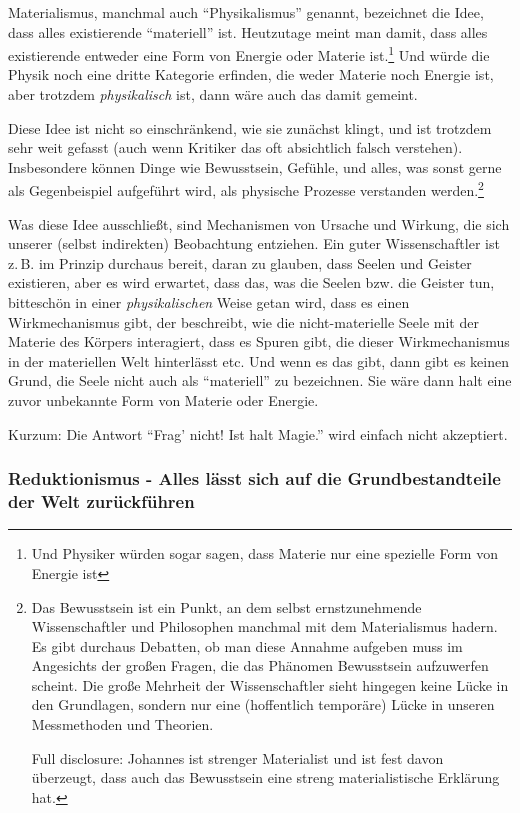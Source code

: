 Materialismus, manchmal auch \enquote{Physikalismus} genannt, bezeichnet die Idee, dass alles existierende
\enquote{materiell}
ist. Heutzutage meint man damit, dass alles existierende entweder eine Form von Energie oder Materie ist.\footnote{Und Physiker würden sogar sagen, dass Materie nur eine spezielle Form von Energie ist} Und würde die Physik noch eine dritte
Kategorie erfinden, die weder Materie noch Energie ist, aber trotzdem \emph{physikalisch}
ist, dann wäre auch das damit gemeint.\cite{sep-physicalism}

Diese Idee ist nicht so einschränkend, wie sie zunächst klingt, und ist trotzdem sehr weit gefasst (auch wenn Kritiker
das oft absichtlich falsch verstehen). Insbesondere können Dinge wie Bewusstsein, Gefühle, und alles, was sonst gerne
als Gegenbeispiel aufgeführt wird, als physische Prozesse verstanden werden.\footnote{Das Bewusstsein ist ein Punkt,
    an dem selbst ernstzunehmende Wissenschaftler und Philosophen manchmal mit dem Materialismus hadern. Es gibt durchaus Debatten,
    ob man diese Annahme aufgeben muss im Angesichts der großen Fragen,
    die das Phänomen Bewusstsein aufzuwerfen scheint. Die große Mehrheit der Wissenschaftler sieht hingegen keine Lücke
    in den Grundlagen, sondern nur eine (hoffentlich temporäre) Lücke in unseren Messmethoden und Theorien.

    Full disclosure: Johannes ist strenger Materialist und ist fest davon überzeugt,
    dass auch das Bewusstsein eine streng materialistische Erklärung hat.}

Was diese Idee ausschließt, sind Mechanismen von Ursache und Wirkung, die sich unserer (selbst indirekten)
Beobachtung entziehen. Ein guter Wissenschaftler ist z.\,B. im Prinzip durchaus bereit, daran zu glauben, dass Seelen und Geister
existieren, aber es wird erwartet, dass das, was die Seelen bzw. die Geister tun, bitteschön in einer
\emph{physikalischen}
Weise getan wird, dass es einen Wirkmechanismus gibt, der beschreibt, wie die nicht-materielle Seele mit der Materie des
Körpers interagiert, dass es Spuren gibt, die dieser Wirkmechanismus in der materiellen Welt hinterlässt etc. Und wenn es das gibt, dann gibt es keinen Grund, die Seele nicht auch als \enquote{materiell} zu bezeichnen. Sie wäre dann halt eine zuvor unbekannte Form von Materie oder Energie.

Kurzum: Die Antwort \enquote{Frag' nicht! Ist halt Magie.} wird einfach nicht akzeptiert.

\subsubsection{Reduktionismus - Alles lässt sich auf die Grundbestandteile der Welt zurückführen}


